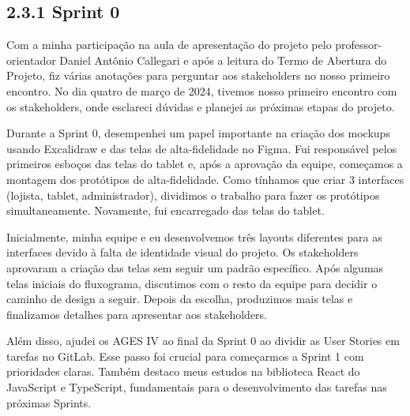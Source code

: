 \hypertarget{__RefHeading___Toc4743_3118176633}{}
\subsection*{2.3.1 Sprint 0\originalspace{}}
\label{sprint:ages-i-0}

\indent \originaltab{}\originalleadingspace{}Com a minha participação na aula de apresentação do projeto pelo professor-orientador Daniel Antônio Callegari e após a leitura do Termo de Abertura do Projeto, fiz várias anotações para perguntar aos stakeholders no nosso primeiro encontro. No dia quatro de março de 2024, tivemos nosso primeiro encontro com os stakeholders, onde esclareci dúvidas e planejei as próximas etapas do projeto.

\indent Durante a Sprint 0, desempenhei um papel importante na criação dos mockups usando Excalidraw e das telas de alta-fidelidade no Figma. Fui responsável pelos primeiros esboços das telas do tablet e, após a aprovação da equipe, começamos a montagem dos protótipos de alta-fidelidade. Como tínhamos que criar 3 interfaces (lojista, tablet, administrador), dividimos o trabalho para fazer os protótipos simultaneamente. Novamente, fui encarregado das telas do tablet.

\indent Inicialmente, minha equipe e eu desenvolvemos três layouts diferentes para as interfaces devido à falta de identidade visual do projeto. Os stakeholders aprovaram a criação das telas sem seguir um padrão específico. Após algumas telas iniciais do fluxograma, discutimos com o resto da equipe para decidir o caminho de design a seguir. Depois da escolha, produzimos mais telas e finalizamos detalhes para apresentar aos stakeholders.

\indent Além disso, ajudei os AGES IV ao final da Sprint 0 ao dividir as User Stories em tarefas no GitLab. Esse passo foi crucial para começarmos a Sprint 1 com prioridades claras. Também destaco meus estudos na biblioteca React do JavaScript e TypeScript, fundamentais para o desenvolvimento das tarefas nas próximas Sprints.

